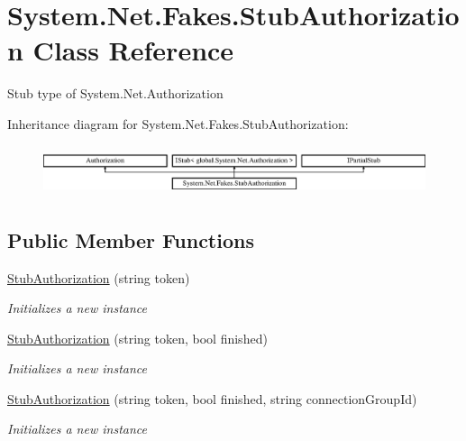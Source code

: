 \hypertarget{class_system_1_1_net_1_1_fakes_1_1_stub_authorization}{\section{System.\-Net.\-Fakes.\-Stub\-Authorization Class Reference}
\label{class_system_1_1_net_1_1_fakes_1_1_stub_authorization}
}


Stub type of System.\-Net.\-Authorization 


Inheritance diagram for System.\-Net.\-Fakes.\-Stub\-Authorization\-:\begin{figure}[H]
\begin{center}
\leavevmode
\includegraphics[height=1.487384cm]{class_system_1_1_net_1_1_fakes_1_1_stub_authorization}
\end{center}
\end{figure}
\subsection*{Public Member Functions}
\begin{DoxyCompactItemize}
\item 
\hyperlink{class_system_1_1_net_1_1_fakes_1_1_stub_authorization_ae2f6413d7f754afecfe2beaacda4ba55}{Stub\-Authorization} (string token)
\begin{DoxyCompactList}\small\item\em Initializes a new instance\end{DoxyCompactList}\item 
\hyperlink{class_system_1_1_net_1_1_fakes_1_1_stub_authorization_a8358bd67daca5a92cc47ebc3b974ef9c}{Stub\-Authorization} (string token, bool finished)
\begin{DoxyCompactList}\small\item\em Initializes a new instance\end{DoxyCompactList}\item 
\hyperlink{class_system_1_1_net_1_1_fakes_1_1_stub_authorization_ac1694b71c9110ac76afe8c70a478611f}{Stub\-Authorization} (string token, bool finished, string connection\-Group\-Id)
\begin{DoxyCompactList}\small\item\em Initializes a new instance\end{DoxyCompactList}\end{DoxyCompactItemize}
